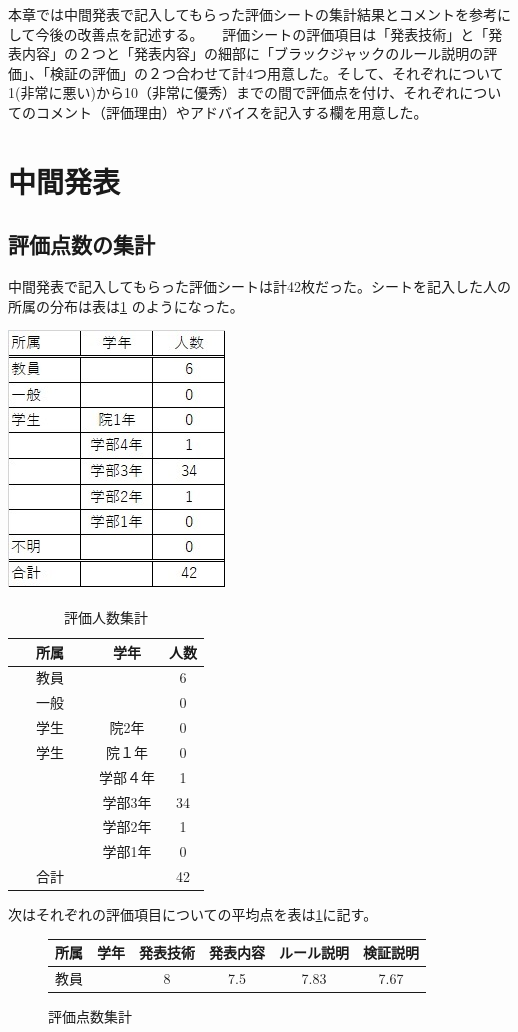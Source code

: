  本章では中間発表で記入してもらった評価シートの集計結果とコメントを参考にして今後の改善点を記述する。
　評価シートの評価項目は「発表技術」と「発表内容」の２つと「発表内容」の細部に「ブラックジャックのルール説明の評価」、「検証の評価」の２つ合わせて計4つ用意した。そして、それぞれについて1(非常に悪い)から10（非常に優秀）までの間で評価点を付け、それぞれについてのコメント（評価理由）やアドバイスを記入する欄を用意した。
\section{中間発表}
\subsection{評価点数の集計}
中間発表で記入してもらった評価シートは計42枚だった。シートを記入した人の所属の分布は表は\ref{tab:dist} のようになった。
\begin{center}
\includegraphics[width=0.\linewidth]{./figure/hyou81.jpg}
\end{center}


\begin{table}[htb]
  \begin{center}
    \caption{評価人数集計}
    \begin{tabular}{|c|c|c|} \hline 
      所属 & 学年 & 人数  \\ \hline \hline
      教員 &  & 6  \\
      一般 &  & 0 \\
      学生 & 院2年 & 0 \\
     学生 & 院１年 & 0 \\
             & 学部４年 & 1 \\
 　　　　　 & 学部3年 & 34 \\
             & 学部2年 & 1 \\
             & 学部1年 & 0 \\ \hline \hline
      合計 &  & 42 \\ \hline
    \end{tabular}
    \label{tab:dist}
  \end{center}
\end{table}
次はそれぞれの評価項目についての平均点を表は\ref{tab:point}に記す。
\begin{figure}
\begin{center}
\caption{評価点数集計}
\begin{tabular}{|c|c|c|c|c|c|} \hline
  所属 & 学年 & 発表技術 & 発表内容 & ルール説明 & 検証説明  \\ \hline \hline
  教員 &        & 8 & 7.5 & 7.83 & 7.67 \\
\end{tabular}
\label{tab:point}
\end{center}
\end{figure}

